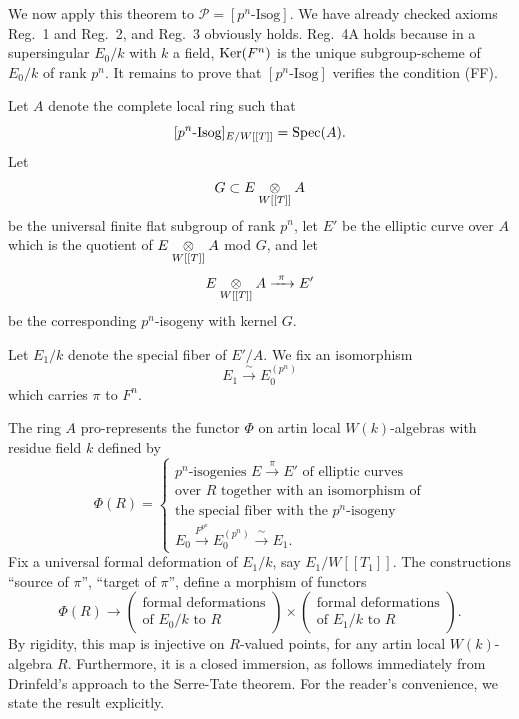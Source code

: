 \begin{pitem}\label{km:6.8.3}
We now apply this theorem to $\mathcal{P} = [p^n\text{-Isog}]$. We have already checked axioms Reg.~1 and Reg.~2, and Reg.~3 obviously holds. Reg.~4A holds because in a supersingular $E_0/k$ with $k$ a field, $\operatorname{Ker}(F^n)$ is the unique subgroup-scheme of $E_0/k$ of rank $p^n$. It remains to prove that $[p^n\text{-Isog}]$ verifies the condition (FF).

Let $A$ denote the complete local ring such that
\[
[p^n\text{-Isog}]_{E/W[[T]]} = \operatorname{Spec}(A) .
\]
Let
\[
G \subset E \underset{W[[T]]}{\otimes} A
\]
be the universal finite flat subgroup of rank $p^n$, let $E'$ be the elliptic curve over $A$ which is the quotient of $E \underset{W[[T]]}{\otimes} A$ mod $G$, and let
\[
E \tens{W[[T]]} A \xrightarrow{\ \pi\ } E'
\]
be the corresponding $p^n$-isogeny with kernel $G$.

Let $E_1/k$ denote the special fiber of $E'/A$. We fix an isomorphism
\[
E_1 \xrightarrow{\ \sim\ } E_0^{(p^n)}
\]
which carries $\pi$ to $F^n$.

The ring $A$ pro-represents the functor $\Phi$ on artin local $W(k)$-algebras with residue field $k$ defined by
\[
\Phi(R) = \left\{ \begin{array}{l}
\text{$p^n$-isogenies } E \xrightarrow{\ \pi\ } E' \text{ of elliptic curves} \\
\text{over } R \text{ together with an isomorphism of} \\
\text{the special fiber with the $p^n$-isogeny} \\[2pt]
E_0 \xrightarrow{F^{p^n}} E_0^{(p^n)} \xrightarrow{\ \sim\ } E_1 .
\end{array} \right.
\]
Fix a universal formal deformation of $E_1/k$, say $E_1/W[[T_1]]$. The constructions ``source of $\pi$'', ``target of $\pi$'', define a morphism of functors
\[
\Phi(R) \to \left( \begin{matrix} \text{formal deformations} \\ \text{of } E_0/k \text{ to } R \end{matrix} \right) \times \left( \begin{matrix} \text{formal deformations} \\ \text{of } E_1/k \text{ to } R \end{matrix} \right) .
\]
By rigidity, this map is injective on $R$-valued points, for any artin local $W(k)$-algebra $R$. Furthermore, it is a closed immersion, as follows immediately from Drinfeld's approach to the Serre-Tate theorem. For the reader's convenience, we state the result explicitly.
\end{pitem}

